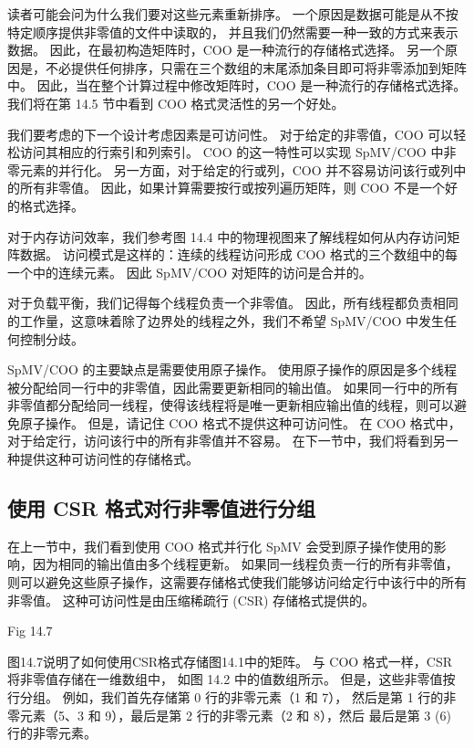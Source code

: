 读者可能会问为什么我们要对这些元素重新排序。 一个原因是数据可能是从不按特定顺序提供非零值的文件中读取的，
并且我们仍然需要一种一致的方式来表示数据。 因此，在最初构造矩阵时，$\mathrm{COO}$ 是一种流行的存储格式选择。 
另一个原因是，不必提供任何排序，只需在三个数组的末尾添加条目即可将非零添加到矩阵中。 
因此，当在整个计算过程中修改矩阵时，$\mathrm{COO}$ 是一种流行的存储格式选择。 
我们将在第 14.5 节中看到 COO 格式灵活性的另一个好处。

我们要考虑的下一个设计考虑因素是可访问性。 对于给定的非零值，COO 可以轻松访问其相应的行索引和列索引。 
$\mathrm{COO}$ 的这一特性可以实现 SpMV/COO 中非零元素的并行化。 
另一方面，对于给定的行或列，COO 并不容易访问该行或列中的所有非零值。 
因此，如果计算需要按行或按列遍历矩阵，则 $\mathrm{COO}$ 不是一个好的格式选择。

对于内存访问效率，我们参考图 14.4 中的物理视图来了解线程如何从内存访问矩阵数据。 
访问模式是这样的：连续的线程访问形成 COO 格式的三个数组中的每一个中的连续元素。 因此 SpMV/COO 对矩阵的访问是合并的。

对于负载平衡，我们记得每个线程负责一个非零值。 
因此，所有线程都负责相同的工作量，这意味着除了边界处的线程之外，我们不希望 SpMV/COO 中发生任何控制分歧。

SpMV/COO 的主要缺点是需要使用原子操作。 使用原子操作的原因是多个线程被分配给同一行中的非零值，因此需要更新相同的输出值。 
如果同一行中的所有非零值都分配给同一线程，使得该线程将是唯一更新相应输出值的线程，则可以避免原子操作。 
但是，请记住 $\mathrm{COO}$ 格式不提供这种可访问性。 
在 $\mathrm{COO}$ 格式中，对于给定行，访问该行中的所有非零值并不容易。 
在下一节中，我们将看到另一种提供这种可访问性的存储格式。

\subsection{使用 CSR 格式对行非零值进行分组}
在上一节中，我们看到使用 COO 格式并行化 SpMV 会受到原子操作使用的影响，因为相同的输出值由多个线程更新。 
如果同一线程负责一行的所有非零值，则可以避免这些原子操作，这需要存储格式使我们能够访问给定行中该行中的所有非零值。 
这种可访问性是由压缩稀疏行 (CSR) 存储格式提供的。

{\color{red} Fig 14.7}

图14.7说明了如何使用CSR格式存储图14.1中的矩阵。 与 COO 格式一样，CSR 将非零值存储在一维数组中，
如图 14.2 中的值数组所示。 但是，这些非零值按行分组。 例如，我们首先存储第 0 行的非零元素（1 和 7），
然后是第 1 行的非零元素（5、3 和 9），最后是第 2 行的非零元素（2 和 8），然后 最后是第 3 (6) 行的非零元素。

